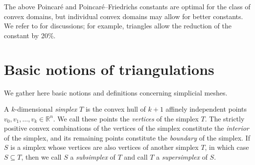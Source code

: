 \documentclass[10pt,a4paper]{article}
\newcommand{\notice}[1]{{\color{red}REMARK: #1}}
\begin{document}

\begin{remark}
    The above Poincar\'e and Poincar\'e--Friedrichs constants are optimal for the class of convex domains, 
    but individual convex domains may allow for better constants.
    We refer to \cite{Liu_Kik_interp_10, Cars_Ged_Rim_expl_cnst_12, matculevich2016explicit} for discussions;
    for example, triangles allow the reduction of the constant by 20\%.
\end{remark}


































\section{Basic notions of triangulations}\label{section:triangulations}

We gather here basic notions and definitions concerning simplicial meshes. 
  

A ${k}$-dimensional \emph{simplex} $T$ is the convex hull of ${k}+1$ affinely independent points $v_0, v_1, \ldots, v_{{k}} \in \mathbb{R}^{n}$. We call these points the \emph{vertices} of the simplex $T$. 
The strictly positive convex combinations of the vertices of the simplex constitute the \textit{ interior} of the simplex,
and its remaining points constitute the \textit{boundary} of the simplex.
If $S$ is a simplex whose vertices are also vertices of another simplex $T$, in which case $S \subseteq T$, 
then we call $S$ a \textit{subsimplex} of $T$ and call $T$ a \textit{supersimplex} of $S$. 
\end{document}
